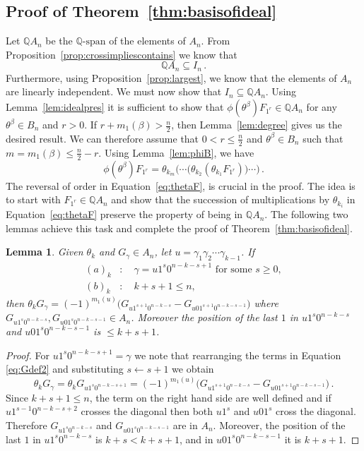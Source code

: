 \documentclass[11pt]{amsart}
\newtheorem{lemma}[theorem]{Lemma}
\theoremstyle{definition}
\numberwithin{equation}{section}
\begin{document}
\subsection{Proof of Theorem~\ref{thm:basisofideal}}\label{ss:proofmainthm}
Let ${\mathbb Q}A_n$ be the ${\mathbb Q}\text{-span}$ of the elements of $A_n$.
From Proposition~\ref{prop:crossimpliescontains} we know that
$${\mathbb Q}A_n \subseteq I_n\,.$$
Furthermore, using Proposition~\ref{prop:largest}, we know that
the elements of $A_n$ are linearly independent.
We must now show that $I_n\subseteq {\mathbb Q}A_n$. Using Lemma~\ref{lem:idealpres} it is sufficient to show that $\phi(\theta^\beta) F_{1^r}\in {\mathbb Q}A_n$ for any $ \theta^\beta \in B_n$ and
$r>0$. If $r+m_1(\beta)>\frac{n}{2}$, then Lemma~\ref{lem:degree} gives us the desired result.
We can therefore assume that $0<r\le \frac{n}{2}$  and $\theta^\beta \in B_n$
such that $m=m_1(\beta)\le \frac{n}{2}-r$.  Using Lemma~\ref{lem:phiB}, we have
\begin{equation}\label{eq:thetaF}
	\phi(\theta^\beta) F_{1^r} =  \theta_{k_m} \Big(\!\!\cdots\!  \big(\theta_{k_2} (\theta_{k_1}F_{1^r})\big)\!\cdots\!\Big)\,.
\end{equation}
The reversal of order in Equation~\eqref{eq:thetaF}, is crucial in the proof.
The idea is to start with $F_{1^r}\in {\mathbb Q}A_n$  and  show that
the succession of multiplications by $\theta_{k_i}$ in Equation~\eqref{eq:thetaF}  preserve the property of being in ${\mathbb Q}A_n$.
The following two lemmas achieve this task and complete the proof of Theorem~\ref{thm:basisofideal}.

\begin{lemma}\label{lem:thetaG}
 Given $\theta_k$ and $G_\gamma\in A_n$, let $u=\gamma_1\gamma_2\cdots\gamma_{k-1}$.  If
 \begin{align*}
 	(a)_k&:\quad \gamma = u1^{s}0^{n-k-s+1}\text{ for some }s\ge 0,\\
	(b)_k&:\quad k+s+1\le n,
 \end{align*}
 then $\theta_kG_\gamma =(-1)^{m_1(u)}\big( G_{u1^{s+1}0^{n-k-s}} - G_{u01^{s+1}0^{n-k-s-1}} \big)$ where $G_{u1^{s}0^{n-k-s}},G_{u01^{s}0^{n-k-s-1}}\in A_n$. Moreover the
 position of the last $1$ in $u1^{s}0^{n-k-s}$ and $u01^{s}0^{n-k-s-1}$ is $\le k+s+1$.
\end{lemma}

\begin{proof}
For $u1^{s}0^{n-k-s+1}=\gamma$ we
note that rearranging the terms in Equation \eqref{eq:Gdef2} and substituting $s\leftarrow s+1$ we obtain
\begin{equation}\label{eq:thetaG}
    \theta_k G_\gamma =  \theta_k G_{u1^{s}0^{n-k-s+1}} = (-1)^{m_1(u)}\big( G_{u1^{s+1}0^{n-k-s}} - G_{u01^{s+1}0^{n-k-s-1}} \big)\,.
\end{equation}
Since $k+s+1\le n$, the term on the right hand side  are well defined and
if $u1^{s-1}0^{n-k-s+2}$ crosses the diagonal then both
$u1^{s}$ and $u01^{s}$ cross the diagonal. Therefore $G_{u1^{s}0^{n-k-s}}$ and $G_{u01^{s}0^{n-k-s-1}}$ are in $A_n$. Moreover, the position of the last $1$ in $u1^{s}0^{n-k-s}$ is $k+s<k+s+1$, and in $u01^{s}0^{n-k-s-1}$ it is $k+s+1$.
\end{proof}
\end{document}
